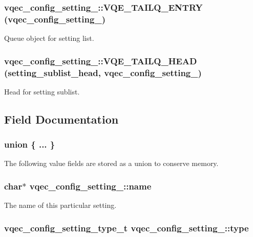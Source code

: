 \subsubsection{\setlength{\rightskip}{0pt plus 5cm}vqec\_\-config\_\-setting\_\-::VQE\_\-TAILQ\_\-ENTRY (\bf{vqec\_\-config\_\-setting\_\-})}\label{structvqec__config__setting___73377747ac4c30107004d3dd9e3ff46d}


Queue object for setting list. 
\subsubsection{\setlength{\rightskip}{0pt plus 5cm}vqec\_\-config\_\-setting\_\-::VQE\_\-TAILQ\_\-HEAD (setting\_\-sublist\_\-head, \bf{vqec\_\-config\_\-setting\_\-})}\label{structvqec__config__setting___07a2bb2dadf4609b166a6ac69b8365b0}


Head for setting sublist. 

\subsection{Field Documentation}
\subsubsection{\setlength{\rightskip}{0pt plus 5cm}union \{ ... \} }\label{structvqec__config__setting___de389a27f62092da46e3a4855a5eaf6d}


The following value fields are stored as a union to conserve memory. 
\subsubsection{\setlength{\rightskip}{0pt plus 5cm}char$\ast$ \bf{vqec\_\-config\_\-setting\_\-::name}}\label{structvqec__config__setting___7ad3391ba76e66f867852ba319fda637}


The name of this particular setting. 
\subsubsection{\setlength{\rightskip}{0pt plus 5cm}\bf{vqec\_\-config\_\-setting\_\-type\_\-t} \bf{vqec\_\-config\_\-setting\_\-::type}}\label{structvqec__config__setting___e2d7dcd1f9b6a61f6d4cecefc7e1d8c5}


